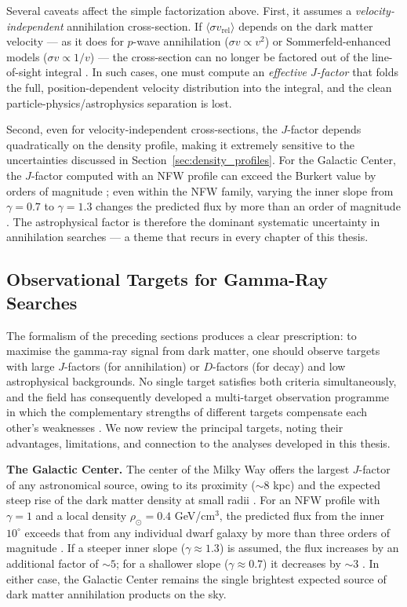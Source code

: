 Several caveats affect the simple factorization above.
First, it assumes a \textit{velocity-independent} annihilation cross-section.
If $\langle \sigma v_\text{rel} \rangle$ depends on the dark matter velocity --- as it does for $p$-wave annihilation ($\sigma v \propto v^2$) or Sommerfeld-enhanced models ($\sigma v \propto 1/v$) --- the cross-section can no longer be factored out of the line-of-sight integral \cite{Cirelli:2024ssz}.
In such cases, one must compute an \textit{effective $J$-factor} that folds the full, position-dependent velocity distribution into the integral, and the clean particle-physics/astrophysics separation is lost.

Second, even for velocity-independent cross-sections, the $J$-factor depends quadratically on the density profile, making it extremely sensitive to the uncertainties discussed in Section~\ref{sec:density_profiles}.
For the Galactic Center, the $J$-factor computed with an NFW profile can exceed the Burkert value by orders of magnitude \cite{Cirelli:2024ssz}; even within the NFW family, varying the inner slope from $\gamma = 0.7$ to $\gamma = 1.3$ changes the predicted flux by more than an order of magnitude \cite{Hooper:2024}.
The astrophysical factor is therefore the dominant systematic uncertainty in annihilation searches --- a theme that recurs in every chapter of this thesis.

\subsection{Observational Targets for Gamma-Ray Searches}
\label{sec:targets}

The formalism of the preceding sections produces a clear prescription: to maximise the gamma-ray signal from dark matter, one should observe targets with large $J$-factors (for annihilation) or $D$-factors (for decay) and low astrophysical backgrounds.
No single target satisfies both criteria simultaneously, and the field has consequently developed a multi-target observation programme in which the complementary strengths of different targets compensate each other's weaknesses \cite{Cirelli:2024ssz}.
We now review the principal targets, noting their advantages, limitations, and connection to the analyses developed in this thesis.

\textbf{The Galactic Center.}
The center of the Milky Way offers the largest $J$-factor of any astronomical source, owing to its proximity ($\sim 8$ kpc) and the expected steep rise of the dark matter density at small radii \cite{Hooper:2024,Pinetti:2021jjs}.
For an NFW profile with $\gamma = 1$ and a local density $\rho_\odot = 0.4$ GeV/cm$^3$, the predicted flux from the inner $10^\circ$ exceeds that from any individual dwarf galaxy by more than three orders of magnitude \cite{Hooper:2024}.
If a steeper inner slope ($\gamma \approx 1.3$) is assumed, the flux increases by an additional factor of $\sim 5$; for a shallower slope ($\gamma \approx 0.7$) it decreases by $\sim 3$ \cite{Hooper:2024}.
In either case, the Galactic Center remains the single brightest expected source of dark matter annihilation products on the sky.

